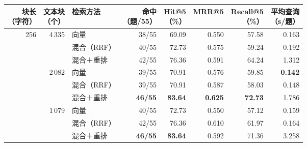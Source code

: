 \begingroup
\small
\setlength{\tabcolsep}{5pt}
\renewcommand{\arraystretch}{1.16}
\begin{tabularx}{\linewidth}{@{}r r >{\raggedright\arraybackslash}X r r r r r@{}}
\toprule
\shortstack{块长\\（字符）} & \shortstack{文本块\\（个）} & 检索方法 & \shortstack{命中\\（题/55）} & \shortstack{Hit@5\\（\%）} & MRR@5 & \shortstack{Recall@5\\（\%）} & \shortstack{平均查询\\（s/题）} \\
\midrule
256 & 4\,335 & 向量 & 38/55 & 69.09 & 0.550 & 57.58 & 0.163 \\
 &  & 混合（RRF） & 40/55 & 72.73 & 0.575 & 59.24 & 0.192 \\
 &  & 混合＋重排 & 42/55 & 76.36 & 0.591 & 64.24 & 1.312 \\
\addlinespace[5pt]
512 & 2\,082 & 向量 & 39/55 & 70.91 & 0.576 & 59.85 & \textbf{0.142} \\
 &  & 混合（RRF） & 39/55 & 70.91 & 0.587 & 58.03 & 0.148 \\
 &  & 混合＋重排 & \textbf{46/55} & \textbf{83.64} & \textbf{0.625} & \textbf{72.73} & 1.786 \\
\addlinespace[5pt]
1024 & 1\,079 & 向量 & 40/55 & 72.73 & 0.550 & 57.12 & 0.159 \\
 &  & 混合（RRF） & 42/55 & 76.36 & 0.610 & 61.97 & 0.164 \\
 &  & 混合＋重排 & \textbf{46/55} & \textbf{83.64} & 0.592 & 71.36 & 3.258 \\
\bottomrule
\end{tabularx}
\par\vspace{4pt}{\footnotesize 每配置 $n=55$；共 495 次检索，均为递归字符分块。相关性以文件名与 PDF 物理页共同匹配。粗体表示九配置中的最优值（延迟取最小），并列最优均标粗。\par}
\endgroup
